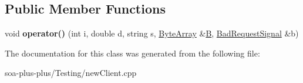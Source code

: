 \subsection*{Public Member Functions}
\begin{DoxyCompactItemize}
\item 
\hypertarget{class_particular_service_stream_stub_a7051aee24513e3df076c7a7018f7f106}{
void {\bfseries operator()} (int i, double d, string s, \hyperlink{class_byte_array}{ByteArray} \&\hyperlink{class_b}{B}, \hyperlink{class_bad_request_signal}{BadRequestSignal} \&b)}
\label{class_particular_service_stream_stub_a7051aee24513e3df076c7a7018f7f106}

\end{DoxyCompactItemize}


The documentation for this class was generated from the following file:\begin{DoxyCompactItemize}
\item 
soa-\/plus-\/plus/Testing/newClient.cpp\end{DoxyCompactItemize}
